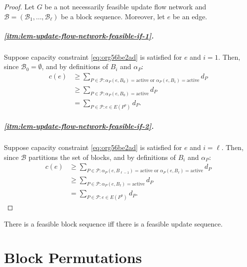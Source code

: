 \documentclass[fontsize=11pt,paper=a4]{book}
\begin{document}
\begin{proof}
Let \(G\) be a not necessarily feasible update flow network and \(\mathcal{B}=(\mathscr{B}_1,\dots,\mathscr{B}_{\ell})\) be a block sequence.
Moreover, let \(e\) be an edge.

\paragraph{\ref{itm:lem-update-flow-network-feasible-if-1}.}
Suppose capacity constraint \ref{eq:org56be2ad}  is satisfied for \(e\) and \(i=1\).
Then, since \(\mathscr{B}_0=\emptyset\), and by definitions of \(B_i\) and \(\alpha_P\):
\begin{align*}
c(e)
&\geq\sum_{P\in\mathcal{P}:\alpha_P(e,B_0)=\mathrm{active}\text{ or }\alpha_P(e,B_1)=\mathrm{active}}d_P\\
&\geq\sum_{P\in\mathcal{P}:\alpha_P(e,B_0)=\mathrm{active}}d_P\\
&=\sum_{P\in\mathcal{P}:e\in E(P^o)}d_P.
\end{align*}
\paragraph{\ref{itm:lem-update-flow-network-feasible-if-2}.}
Suppose capacity constraint \ref{eq:org56be2ad}  is satisfied for \(e\) and \(i=\ell\).
Then, since \(\mathcal{B}\) partitions the set of blocks, and by definitions of \(B_i\) and \(\alpha_P\):
\begin{align*}
c(e)
&\geq\sum_{P\in\mathcal{P}:\alpha_P(e,B_{\ell-1})=\mathrm{active}\text{ or }\alpha_P(e,B_{\ell})=\mathrm{active}}d_P\\
&\geq\sum_{P\in\mathcal{P}:\alpha_P(e,B_{\ell})=\mathrm{active}}d_P\\
&=\sum_{P\in\mathcal{P}:e\in E(P^u)}d_P.
\end{align*}
\end{proof}

\begin{corollary}
There is a feasible block sequence iff there is a feasible update sequence.
\label{org1eb86ee}
\end{corollary}

\chapter{Block Permutations}
\label{sec:org55b711c}
\end{document}
